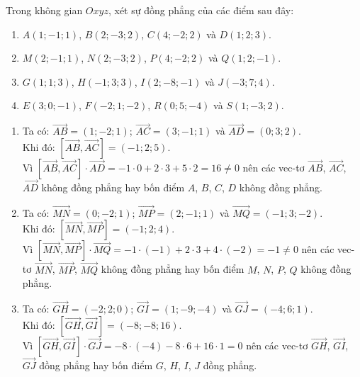 \begin{bt}%
	Trong không gian $Oxyz$, xét sự đồng phẳng của các điểm sau đây:
	\begin{enumerate}
		\item $A(1;-1;1)$, $B(2;-3;2)$, $C(4;-2;2)$ và $D(1;2;3)$.
		\item $M(2;-1;1)$, $N(2;-3;2)$, $P(4;-2;2)$ và $Q(1;2;-1)$.
		\item $G(1;1;3)$, $H(-1;3;3)$, $I(2;-8;-1)$ và $J(-3;7;4)$.
		\item $E(3;0;-1)$, $F(-2;1;-2)$, $R(0;5;-4)$ và $S(1;-3;2)$.
	\end{enumerate}
	\loigiai
	{
		\begin{enumerate}
			\item Ta có: $\overrightarrow{AB} = (1;-2;1)$; $\overrightarrow{AC} = (3;-1;1)$ và $\overrightarrow{AD} = (0;3;2)$.\\
			Khi đó: $\left[ \overrightarrow{AB},\overrightarrow{AC} \right] = (-1;2;5)$.\\
			Vì $\left[ \overrightarrow{AB},\overrightarrow{AC} \right] \cdot \overrightarrow{AD} = -1 \cdot 0 + 2 \cdot 3 + 5 \cdot 2 = 16 \neq 0$ nên các vec-tơ $\overrightarrow{AB}$, $\overrightarrow{AC}$, $\overrightarrow{AD}$ không đồng phẳng hay bốn điểm $A$, $B$, $C$, $D$ không đồng phẳng.
			
			\item Ta có: $\overrightarrow{MN} = (0;-2;1)$; $\overrightarrow{MP} = (2;-1;1)$ và $\overrightarrow{MQ} = (-1;3;-2)$.\\
			Khi đó: $\left[ \overrightarrow{MN},\overrightarrow{MP} \right] = (-1;2;4)$.\\
			Vì $\left[ \overrightarrow{MN},\overrightarrow{MP} \right] \cdot \overrightarrow{MQ} = -1 \cdot (-1) + 2 \cdot 3 + 4 \cdot (-2) = -1 \neq 0$ nên các vec-tơ $\overrightarrow{MN}$, $\overrightarrow{MP}$, $\overrightarrow{MQ}$ không đồng phẳng hay bốn điểm $M$, $N$, $P$, $Q$ không đồng phẳng.
			
			\item Ta có: $\overrightarrow{GH} = (-2;2;0)$; $\overrightarrow{GI} = (1;-9;-4)$ và $\overrightarrow{GJ} = (-4;6;1)$.\\
			Khi đó: $\left[ \overrightarrow{GH},\overrightarrow{GI} \right] = (-8;-8;16)$.\\
			Vì $\left[ \overrightarrow{GH},\overrightarrow{GI} \right] \cdot \overrightarrow{GJ} = -8 \cdot (-4) - 8 \cdot 6 + 16 \cdot 1 = 0$ nên các vec-tơ $\overrightarrow{GH}$, $\overrightarrow{GI}$, $\overrightarrow{GJ}$ đồng phẳng hay bốn điểm $G$, $H$, $I$, $J$ đồng phẳng.
			

\end{enumerate}}
\end{bt}
